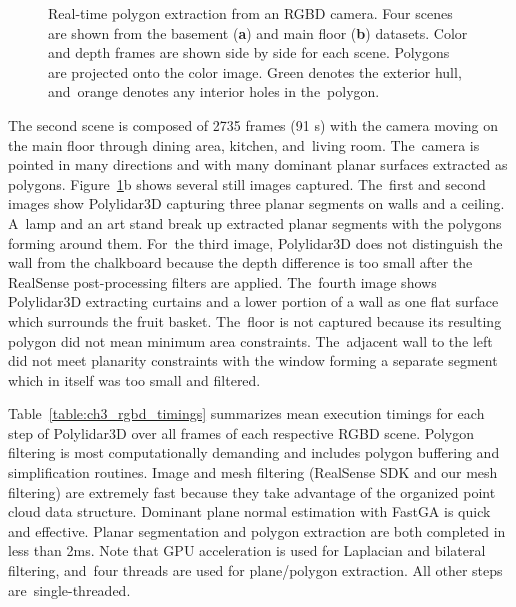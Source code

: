 \begin{figure}[ht]
  \caption[Example of Polylidar3D used with \ac{RGBD} cameras]{Real-time polygon extraction from an \ac{RGBD} camera. %
 Four scenes are shown from the basement (\textbf{a}) and main floor (\textbf{b}) datasets. Color and depth frames are shown side by side for each scene. Polygons are projected onto the color image. Green denotes the exterior hull, and~orange denotes any interior holes in the~polygon.}\label{fig:ch3_rgbd}
\end{figure}

The second scene is composed of 2735 frames (91 s) with the camera moving on the main floor through dining area, kitchen, and~living room. The~camera is pointed in many directions and with many dominant planar surfaces extracted as polygons. Figure~\ref{fig:ch3_rgbd}b shows several still images captured. The~first and second images show Polylidar3D capturing three planar segments on walls and a ceiling. A~lamp and an art stand break up extracted planar segments with the polygons forming around them. For~the third image, Polylidar3D does not distinguish the wall from the chalkboard because the depth difference is too small after the RealSense post-processing filters are applied.  The~fourth image shows Polylidar3D extracting curtains and a lower portion of a wall as one flat surface which surrounds the fruit basket. The~floor is not captured because its resulting polygon did not mean minimum area constraints. The~adjacent wall to the left did not meet planarity constraints with the window forming a separate segment which in itself was too small and filtered. 

Table~\ref{table:ch3_rgbd_timings} summarizes mean execution timings for each step of Polylidar3D over all frames of each respective \ac{RGBD} scene. Polygon filtering is most computationally demanding and includes polygon buffering and simplification routines.  Image and mesh filtering (RealSense SDK and our mesh filtering) are extremely fast because they take advantage of the organized point cloud data structure. Dominant plane normal estimation with FastGA is quick and effective. Planar segmentation and polygon extraction are both completed in less than 2ms. Note that GPU acceleration is used for Laplacian and bilateral filtering, and~four threads are used for plane/polygon extraction. All other steps are~single-threaded.

